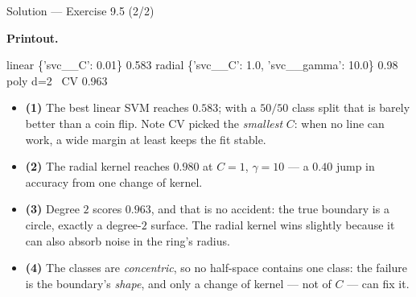 \documentclass[aspectratio=169,11pt]{beamer}
\begin{document}
\begin{frame}{Solution --- Exercise 9.5 (2/2)}
\begin{solutionbox}
  \scriptsize
  \textbf{Printout.}
  \begin{center}\ttfamily\scriptsize
  linear \{'svc\_\_C': 0.01\} 0.583 \quad radial \{'svc\_\_C': 1.0, 'svc\_\_gamma': 10.0\} 0.98
  \quad poly d=2 \ CV 0.963
  \end{center}
  \begin{itemize}
    \item \textbf{(1)} The best linear SVM reaches $0.583$; with a $50/50$
          class split that is barely better than a coin flip. Note CV picked
          the \emph{smallest} $C$: when no line can work, a wide margin at
          least keeps the fit stable.
    \item \textbf{(2)} The radial kernel reaches $\mathbf{0.980}$ at $C=1$,
          $\gamma=10$ --- a $0.40$ jump in accuracy from one change of kernel.
    \item \textbf{(3)} Degree $2$ scores $0.963$, and that is no accident: the
          true boundary is a circle, exactly a degree-$2$ surface. The radial
          kernel wins slightly because it can also absorb noise in the ring's
          radius.
    \item \textbf{(4)} The classes are \emph{concentric}, so no half-space
          contains one class: the failure is the boundary's \emph{shape}, and
          only a change of kernel --- not of $C$ --- can fix it.
  \end{itemize}
\end{solutionbox}
\end{frame}
\end{document}
